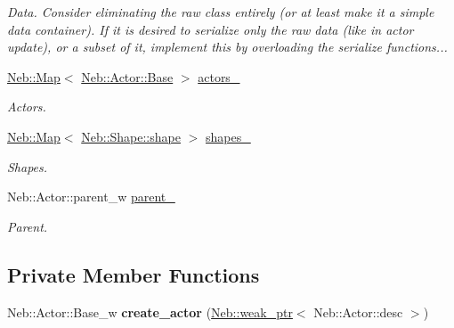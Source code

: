 \begin{DoxyCompactItemize}
\begin{DoxyCompactList}\small\item\em \-Data. \-Consider eliminating the raw class entirely (or at least make it a simple data container). \-If it is desired to serialize only the raw data (like in actor update), or a subset of it, implement this by overloading the serialize functions... \end{DoxyCompactList}\item 
\hypertarget{classNeb_1_1Actor_1_1Base_a37bec6f052f9394c549c3ef3f2604463}{\hyperlink{classNeb_1_1Map}{\-Neb\-::\-Map}$<$ \hyperlink{classNeb_1_1Actor_1_1Base}{\-Neb\-::\-Actor\-::\-Base} $>$ \hyperlink{classNeb_1_1Actor_1_1Base_a37bec6f052f9394c549c3ef3f2604463}{actors\-\_\-}}\label{classNeb_1_1Actor_1_1Base_a37bec6f052f9394c549c3ef3f2604463}

\begin{DoxyCompactList}\small\item\em \-Actors. \end{DoxyCompactList}\item 
\hypertarget{classNeb_1_1Actor_1_1Base_a2f86088b28161b53b2a0a270adc5d7fd}{\hyperlink{classNeb_1_1Map}{\-Neb\-::\-Map}$<$ \hyperlink{classNeb_1_1Shape_1_1shape}{\-Neb\-::\-Shape\-::shape} $>$ \hyperlink{classNeb_1_1Actor_1_1Base_a2f86088b28161b53b2a0a270adc5d7fd}{shapes\-\_\-}}\label{classNeb_1_1Actor_1_1Base_a2f86088b28161b53b2a0a270adc5d7fd}

\begin{DoxyCompactList}\small\item\em \-Shapes. \end{DoxyCompactList}\item 
\hypertarget{classNeb_1_1Actor_1_1Base_abeafd817e187aea634174d9091bdcc7b}{\-Neb\-::\-Actor\-::parent\-\_\-w \hyperlink{classNeb_1_1Actor_1_1Base_abeafd817e187aea634174d9091bdcc7b}{parent\-\_\-}}\label{classNeb_1_1Actor_1_1Base_abeafd817e187aea634174d9091bdcc7b}

\begin{DoxyCompactList}\small\item\em \-Parent. \end{DoxyCompactList}\end{DoxyCompactItemize}
\subsection*{\-Private \-Member \-Functions}
\begin{DoxyCompactItemize}
\item 
\hypertarget{classNeb_1_1Actor_1_1Base_a0f0ca2c4479ec943308815c36be1e898}{\-Neb\-::\-Actor\-::\-Base\-\_\-w {\bfseries create\-\_\-actor} (\hyperlink{classNeb_1_1weak__ptr}{\-Neb\-::weak\-\_\-ptr}$<$ \-Neb\-::\-Actor\-::desc $>$)}\label{classNeb_1_1Actor_1_1Base_a0f0ca2c4479ec943308815c36be1e898}

\end{DoxyCompactItemize}


